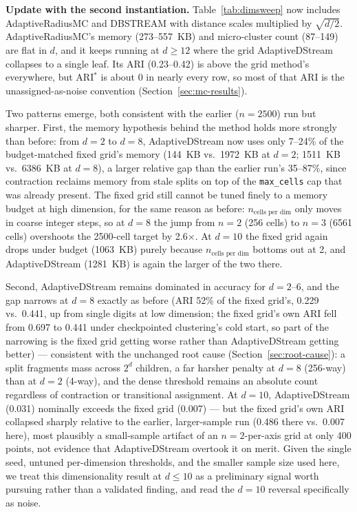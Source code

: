 \documentclass[11pt]{article}
\begin{document}
\textbf{Update with the second instantiation.} Table~\ref{tab:dimsweep} now includes AdaptiveRadiusMC and DBSTREAM with distance scales multiplied by $\sqrt{d/2}$. AdaptiveRadiusMC's memory (273--557~KB) and micro-cluster count (87--149) are flat in $d$, and it keeps running at $d\geq 12$ where the grid AdaptiveDStream collapses to a single leaf. Its ARI (0.23--0.42) is above the grid method's everywhere, but ARI$^*$ is about 0 in nearly every row, so most of that ARI is the unassigned-as-noise convention (Section~\ref{sec:mc-results}).

Two patterns emerge, both consistent with the earlier ($n=2500$) run but sharper. First, the memory hypothesis behind the method holds more strongly than before: from $d=2$ to $d=8$, AdaptiveDStream now uses only 7--24\% of the budget-matched fixed grid's memory (144~KB vs.\ 1972~KB at $d=2$; 1511~KB vs.\ 6386~KB at $d=8$), a larger relative gap than the earlier run's 35--87\%, since contraction reclaims memory from stale splits on top of the \texttt{max\_cells} cap that was already present. The fixed grid still cannot be tuned finely to a memory budget at high dimension, for the same reason as before: $n_{\text{cells per dim}}$ only moves in coarse integer steps, so at $d=8$ the jump from $n=2$ (256 cells) to $n=3$ (6561 cells) overshoots the 2500-cell target by 2.6$\times$. At $d=10$ the fixed grid again drops under budget (1063~KB) purely because $n_{\text{cells per dim}}$ bottoms out at 2, and AdaptiveDStream (1281~KB) is again the larger of the two there.

Second, AdaptiveDStream remains dominated in accuracy for $d=2$--$6$, and the gap narrows at $d=8$ exactly as before (ARI 52\% of the fixed grid's, 0.229 vs.\ 0.441, up from single digits at low dimension; the fixed grid's own ARI fell from 0.697 to 0.441 under checkpointed clustering's cold start, so part of the narrowing is the fixed grid getting worse rather than AdaptiveDStream getting better) — consistent with the unchanged root cause (Section~\ref{sec:root-cause}): a split fragments mass across $2^d$ children, a far harsher penalty at $d=8$ (256-way) than at $d=2$ (4-way), and the dense threshold remains an absolute count regardless of contraction or transitional assignment. At $d=10$, AdaptiveDStream (0.031) nominally exceeds the fixed grid (0.007) — but the fixed grid's own ARI collapsed sharply relative to the earlier, larger-sample run (0.486 there vs.\ 0.007 here), most plausibly a small-sample artifact of an $n{=}2$-per-axis grid at only 400 points, not evidence that AdaptiveDStream overtook it on merit. Given the single seed, untuned per-dimension thresholds, and the smaller sample size used here, we treat this dimensionality result at $d\le 10$ as a preliminary signal worth pursuing rather than a validated finding, and read the $d=10$ reversal specifically as noise.
\end{document}
